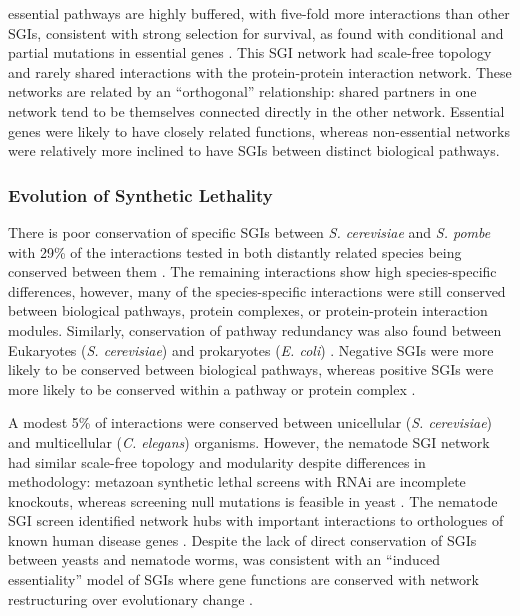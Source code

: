 \Gls{essential} \glspl{pathway} are highly buffered, with five-fold more interactions than other \glspl{SGI}, consistent with strong selection for survival, as found with conditional and partial \glspl{mutation} in \gls{essential} genes \citep{Davierwala2005}. This \gls{SGI} network had \gls{scale-free} topology and rarely shared interactions with the protein-protein interaction network. These networks are related by an ``orthogonal'' relationship: shared partners in one network tend to be themselves connected directly in the other network. Essential genes were likely to have closely related functions, whereas non-\gls{essential} networks were relatively more inclined to have \glspl{SGI} between distinct biological \glspl{pathway}. 

\subsubsection{Evolution of Synthetic Lethality}
There is poor conservation of specific \glspl{SGI} between \textit{S. cerevisiae} and \textit{S. pombe} with 29\% of the interactions tested in both distantly related species being conserved between them \citep{Dixon2008}. The remaining interactions show high species-specific differences, however, many of the species-specific interactions were still conserved between biological \glspl{pathway}, protein complexes, or protein-protein interaction modules. Similarly, conservation of \gls{pathway} redundancy was also found between  Eukaryotes (\textit{S. cerevisiae}) and prokaryotes (\textit{E. coli}) \citep{Butland2008}. Negative \glspl{SGI} were more likely to be conserved between biological \glspl{pathway}, whereas positive \glspl{SGI} were more likely to be conserved within a \gls{pathway} or protein complex \citep{Roguev2008}. 

A modest 5\% of interactions were conserved between unicellular (\textit{S. cerevisiae}) and multicellular (\textit{C. elegans}) organisms. However, the nematode \gls{SGI} network had similar \gls{scale-free} topology and modularity despite differences in methodology: metazoan \gls{synthetic lethal} screens with \acrfull{RNAi} are incomplete knockouts, whereas screening null \glspl{mutation} is feasible in yeast \citep{Bussey2006}. The nematode \gls{SGI} screen identified network hubs with important interactions to orthologues of known human disease genes \citep{Lehner2006}. Despite the lack of direct conservation of \glspl{SGI} between yeasts and nematode worms,  was consistent with an ``\gls{induced essentiality}'' model of \glspl{SGI} where gene functions are conserved with network restructuring over evolutionary change \citep{Tischler2008}.


